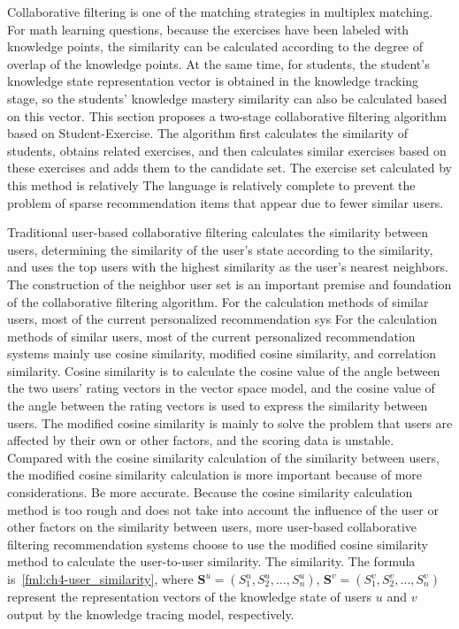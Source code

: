 Collaborative filtering is one of the matching strategies in multiplex matching. For math learning questions, because the exercises have been labeled with knowledge points, the similarity can be calculated according to the degree of overlap of the knowledge points. At the same time, for students, the student's knowledge state representation vector is obtained in the knowledge tracking stage, so the students' knowledge mastery similarity can also be calculated based on this vector. This section proposes a two-stage collaborative filtering algorithm based on Student-Exercise. The algorithm first calculates the similarity of students, obtains related exercises, and then calculates similar exercises based on these exercises and adds them to the candidate set. The exercise set calculated by this method is relatively The language is relatively complete to prevent the problem of sparse recommendation items that appear due to fewer similar users.

Traditional user-based collaborative filtering calculates the similarity between users, determining the similarity of the user's state according to the similarity, and uses the top users with the highest similarity as the user's nearest neighbors. The construction of the neighbor user set is an important premise and foundation of the collaborative filtering algorithm. For the calculation methods of similar users, most of the current personalized recommendation sys For the calculation methods of similar users, most of the current personalized recommendation systems mainly use cosine similarity, modified cosine similarity, and correlation similarity. Cosine similarity is to calculate the cosine value of the angle between the two users' rating vectors in the vector space model, and the cosine value of the angle between the rating vectors is used to express the similarity between users. The modified cosine similarity is mainly to solve the problem that users are affected by their own or other factors, and the scoring data is unstable. Compared with the cosine similarity calculation of the similarity between users, the modified cosine similarity calculation is more important because of more considerations. Be more accurate. Because the cosine similarity calculation method is too rough and does not take into account the influence of the user or other factors on the similarity between users, more user-based collaborative filtering recommendation systems choose to use the modified cosine similarity method to calculate the user-to-user similarity. The similarity. The formula is~\ref{fml:ch4-user_similarity}, where \(\mathbf{S}^u=(S^u_1,S^u_2,\ldots,S^u_n)\), \(\mathbf{S}^v=(S^v_1,S^v_2,\ldots, S^v_n)\) represent the representation vectors of the knowledge state of users \(u\) and \(v\) output by the knowledge tracing model, respectively.

